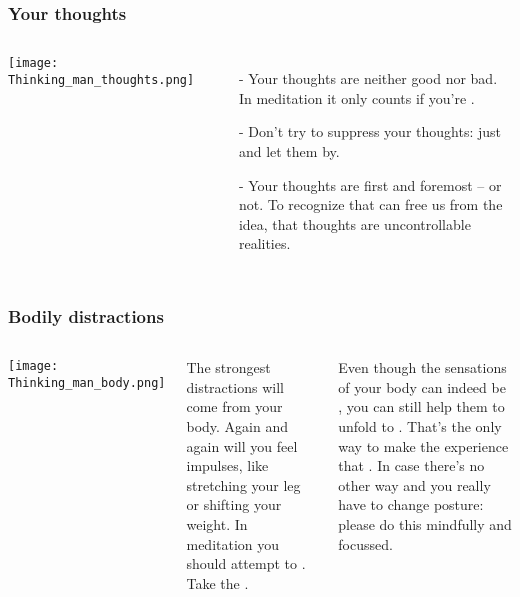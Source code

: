 \begin{frame}
\frametitle{Your thoughts}
\begin{columns}[c] %

\texttt{[image: Thinking\_man\_thoughts.png]}

\begin{itemize}
\item[-]Your thoughts are neither good nor bad. In meditation it only counts if you’re .
\item[-]Don't try to suppress your thoughts: just  and let them  by. 
\item[-]Your thoughts are first and foremost  -- or not. To recognize that can free us from the idea, that thoughts are uncontrollable realities.
\end{itemize}
\end{columns}
\end{frame}

\begin{frame}
\frametitle{Bodily distractions}
\begin{columns}[c] %

\texttt{[image: Thinking\_man\_body.png]}

The strongest distractions will come from your body. Again and again will you feel impulses, like stretching your leg or shifting your weight. In meditation you should attempt to . Take the .

Even though the sensations of your body can indeed be , you can still help them to unfold to . That's the only way to make the experience that . In case there's no other way and you really have to change posture: please do this mindfully and focussed.
\end{columns}
\end{frame}










